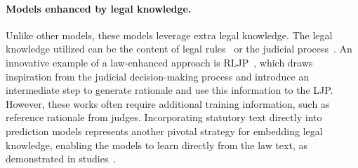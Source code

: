 \paragraph{Models enhanced by legal knowledge.} 
Unlike other models, these models leverage extra legal knowledge. The legal knowledge utilized can be the content of legal rules~\cite{ML-LJP} or the judicial process~\cite{DBLP:conf/emnlp/ZhongGTX0S18,deng-etal-2023-syllogistic}. An innovative example of a law-enhanced approach is RLJP~\cite{Wu2022TowardsIA}, which draws inspiration from the judicial decision-making process and introduce an intermediate step to generate rationale and use this information to the LJP. However, these works often require additional training information, such as reference rationale from judges. Incorporating statutory text directly into prediction models represents another pivotal strategy for embedding legal knowledge, enabling the models to learn directly from the law text, as demonstrated in studies~\cite{neurjudge,ML-LJP}. 




